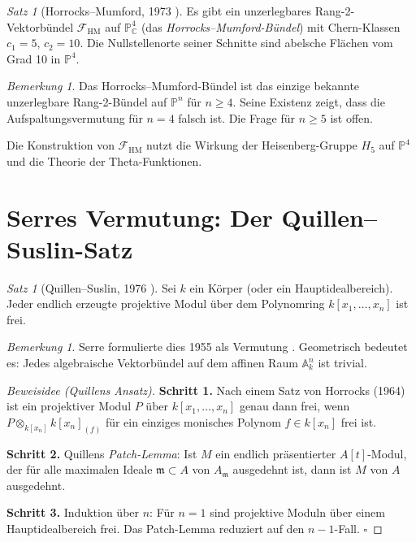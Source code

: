 \documentclass[12pt,a4paper]{amsart}
\theoremstyle{definition}
\theoremstyle{remark}
\newtheorem{satz}[theorem]{Satz}
\newtheorem{bemerkung}[theorem]{Bemerkung}
\newcommand{\PP}{\mathbb{P}}
\newcommand{\CC}{\mathbb{C}}
\begin{document}
\begin{satz}[Horrocks--Mumford, 1973 \cite{HorrocksMumford1973}]
Es gibt ein unzerlegbares Rang-2-Vektorbündel $\mathcal{F}_\mathrm{HM}$
auf $\PP^4_\CC$ (das \emph{Horrocks--Mumford-Bündel}) mit Chern-Klassen
$c_1 = 5$, $c_2 = 10$.  Die Nullstellenorte seiner Schnitte sind abelsche
Flächen vom Grad 10 in $\PP^4$.
\end{satz}

\begin{bemerkung}
Das Horrocks--Mumford-Bündel ist das einzige bekannte unzerlegbare
Rang-2-Bündel auf $\PP^n$ für $n \ge 4$.  Seine Existenz zeigt, dass die
Aufspaltungsvermutung für $n = 4$ falsch ist.
Die Frage für $n \ge 5$ ist offen.
\end{bemerkung}

Die Konstruktion von $\mathcal{F}_\mathrm{HM}$ nutzt die Wirkung der
Heisenberg-Gruppe $H_5$ auf $\PP^4$ und die Theorie der Theta-Funktionen.

\section{Serres Vermutung: Der Quillen--Suslin-Satz}

\begin{satz}[Quillen--Suslin, 1976 \cite{Quillen1976,Suslin1976}]
\label{satz:quillen-suslin}
Sei $k$ ein Körper (oder ein Hauptidealbereich).  Jeder endlich erzeugte
projektive Modul über dem Polynomring $k[x_1,\ldots,x_n]$ ist frei.
\end{satz}

\begin{bemerkung}
Serre formulierte dies 1955 als Vermutung \cite{Serre1955}.
Geometrisch bedeutet es: Jedes algebraische Vektorbündel auf dem affinen
Raum $\mathbb{A}^n_k$ ist trivial.
\end{bemerkung}

\begin{proof}[Beweisidee (Quillens Ansatz)]
\textbf{Schritt 1.}  Nach einem Satz von Horrocks (1964) ist ein projektiver
Modul $P$ über $k[x_1,\ldots,x_n]$ genau dann frei, wenn
$P \otimes_{k[x_n]} k[x_n]_{(f)}$ für ein einziges monisches Polynom
$f \in k[x_n]$ frei ist.

\textbf{Schritt 2.}  Quillens \emph{Patch-Lemma}: Ist $M$ ein endlich
präsentierter $A[t]$-Modul, der für alle maximalen Ideale
$\mathfrak{m} \subset A$ von $A_\mathfrak{m}$ ausgedehnt ist, dann ist $M$
von $A$ ausgedehnt.

\textbf{Schritt 3.}  Induktion über $n$: Für $n=1$ sind projektive Moduln
über einem Hauptidealbereich frei.  Das Patch-Lemma reduziert auf den
$n{-}1$-Fall. $\square$
\end{proof}
\end{document}
